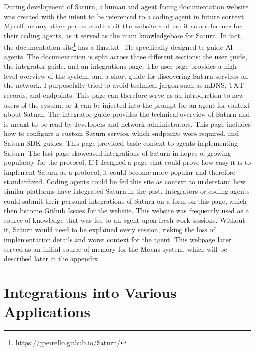 During development of Saturn, a human and agent facing documentation website was created with the intent to be referenced to a coding agent in future context. Myself, or any other person could visit the website and use it as a reference for their coding agents, as it served as the main knowledgebase for Saturn. In fact, the documentation site\footnote{\url{https://jperrello.github.io/Saturn/}} has a llms.txt~\cite{howard2024llmstxt} file specifically designed to guide AI agents. The documentation is split across three different sections: the user guide, the integrator guide, and an integrations page. The user page provides a high level overview of the system, and a short guide for discovering Saturn services on the network. I purposefully tried to avoid technical jargon such as mDNS, TXT records, and endpoints. This page can therefore serve as an introduction to new users of the system, or it can be injected into the prompt for an agent for context about Saturn. The integrator guide provides the technical overview of Saturn and is meant to be read by developers and network administrators. This page includes how to configure a custom Saturn service, which endpoints were required, and Saturn SDK guides. This page provided basic context to agents implementing Saturn. The last page showcased integrations of Saturn in hopes of growing popularity for the protocol. If I designed a page that could prove how easy it is to implement Saturn as a protocol, it could become more popular and therefore standardized. Coding agents could be fed this site as context to understand how similar platforms have integrated Saturn in the past. Integrators or coding agents could submit their personal integrations of Saturn on a form on this page, which then become Github Issues for the website. This website was frequently used as a source of knowledge that was fed to an agent upon fresh work sessions. Without it, Saturn would need to be explained every session, risking the loss of implementation details and worse context for the agent. This webpage later served as an initial source of memory for the Moons system, which will be described later in the appendix.

\section{Integrations into Various Applications}

